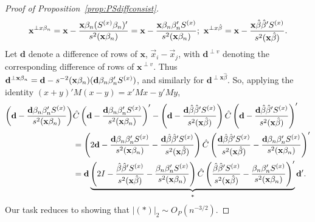 \documentclass{article}
\theoremstyle{remark}
\begin{document}
\begin{proof}[Proof of Proposition~\ref{prop:PSdiffconsist}]
  \begin{equation*}
\mathbf{x}^{\perp x\beta_{n }} = \mathbf{x} - \frac{\mathbf{x}\beta_{n }(S^{(x)}\beta_{n })'}{s^2(\mathbf{x}\beta_{n })}
= \mathbf{x} - \frac{\mathbf{x}\beta_{n }\beta_{n }'S^{(x)}}{s^{2}(\mathbf{x}\beta_{n })} ;   \,\,
\mathbf{x}^{\perp x\hat\beta} = \mathbf{x} - \frac{\mathbf{x} \hat\beta\hat{\beta}' S^{(x)}}{s^{2}(\mathbf{x}\hat\beta)}    .
  \end{equation*}
Let $\mathbf{d}$ denote a difference of rows of $\mathbf{x}$, $\vec{x}_{i} - \vec{x}_{j}$, with $\mathbf{d}^{\perp v}$ denoting the corresponding difference of rows of $\mathbf{x}^{\perp v}$.  
Thus $ \mathbf{d}^{\perp \mathbf{x}\beta_{n }} = \mathbf{d} -  s^{-2}(\mathbf{x}\beta_{n })({\mathbf{d}\beta_{n }\beta_{n }'S^{(x)}})$, and similarly for $\mathbf{d}^{\perp \mathbf{x}\hat\beta}$. So, applying the identity $(x+y)'M(x-y) = x'Mx - y'My$, %
\begin{align}
  \left(\mathbf{d} -  \frac {\mathbf{d}\betatrue\betatrue'S^{(x)}}{s^2(\mathbf{x}\betatrue)}\right) & \hat{C}%
 \left(\mathbf{d} - \frac {\mathbf{d}\betatrue\betatrue'S^{(x)}}{s^2(\mathbf{x}\betatrue)}\right)' - 
  \left(\mathbf{d} - \frac {\mathbf{d}\hat\beta\hat{\beta}'S^{(x)}}{s^2(\mathbf{x}\hat\beta)}\right)\hat{C}%
 \left(\mathbf{d} - \frac {\mathbf{d}\hat\beta\hat{\beta}'S^{(x)}}{s^2(\mathbf{x}\hat\beta)}\right)' \nonumber \\
&= \left(2\mathbf{d} - \frac {\mathbf{d}\betatrue\betatrue'S^{(x)}}{s^2(\mathbf{x}\betatrue)} - \frac {\mathbf{d}\hat\beta\hat{\beta}'S^{(x)}}{s^2(\mathbf{x}\hat\beta)}\right) \hat{C} \left(\frac {\mathbf{d}\hat\beta\hat{\beta}'S^{(x)}}{s^2(\mathbf{x}\hat\beta)} - \frac {\mathbf{d}\betatrue\betatrue'S^{(x)}}{s^2(\mathbf{x}\betatrue)} \right)' \nonumber\\
&= \mathbf{d} \underbrace{\left(2I - \frac {\hat\beta\hat{\beta}'S^{(x)}}{s^2(\mathbf{x}\hat\beta)} - \frac {\betatrue\betatrue'S^{(x)}}{s^2(\mathbf{x}\betatrue)} \right) \hat{C} \left(\frac {\hat\beta\hat{\beta}'S^{(x)}}{s^2(\mathbf{x}\hat\beta)} - \frac {\betatrue\betatrue'S^{(x)}}{s^2(\mathbf{x}\betatrue)} \right)'}_{*}\mathbf{d}'\label{eq:9}.
\end{align}
Our task reduces to showing that %
$|(*)|_{2} \sim O_{P}(n^{-3/2}) $.


\end{proof}
\end{document}
